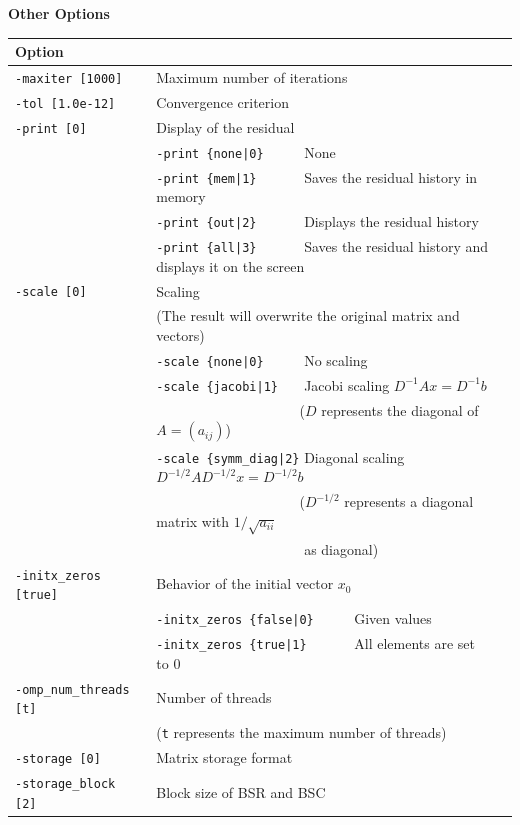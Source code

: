 \documentclass[a4paper]{article}
\begin{document}
\begin{minipage}[t]{\textwidth}
\begin{center}
{\bf Other Options}\\
\begin{tabular}{l|ll}\hline\hline
Option &                          \\ \hline
\verb=-maxiter [1000]= & Maximum number of iterations         \\ 
\verb=-tol [1.0e-12]=  & Convergence criterion              \\
\verb=-print [0]=      & Display of the residual                 \\
                       & \verb=-print {none|0}     =  None \\
                       & \verb=-print {mem|1}      =  Saves the residual history in memory\\
                       & \verb=-print {out|2}      =  Displays the residual history\\
                       & \verb=-print {all|3}      =  Saves the residual history and displays it on the screen\\
\verb=-scale [0]=      & Scaling \\
                       & (The result will overwrite the original matrix and vectors) \\
                       & \verb=-scale {none|0}     =  No scaling \\ 
                       & \verb=-scale {jacobi|1}   =  Jacobi scaling $D^{-1}Ax=D^{-1}b$ \\
                       & \verb=                    =  ($D$ represents the diagonal of $A=(a_{ij})$)\\
                       & \verb=-scale {symm_diag|2}=  Diagonal scaling $D^{-1/2}AD^{-1/2}x=D^{-1/2}b$ \\
                       & \verb=                    =  ($D^{-1/2}$ represents a diagonal matrix with $1/\sqrt{a_{ii}}$ \\
                       & \verb=                    =   as diagonal) \\ 
\verb=-initx_zeros [true]= & Behavior of the initial vector $x_{0}$  \\
                       & \verb=-initx_zeros {false|0}     =  Given values \\
                       & \verb=-initx_zeros {true|1}      =  All elements are set to $0$ \\
\verb=-omp_num_threads [t]= & Number of threads        \\ 
                            & (\verb=t= represents the maximum number of threads) \\
\verb=-storage [0]=    & Matrix storage format \\
\verb=-storage_block [2]=& Block size of BSR and BSC\\ 
\hline         
\end{tabular}
\end{center}
\end{minipage}
\end{document}
